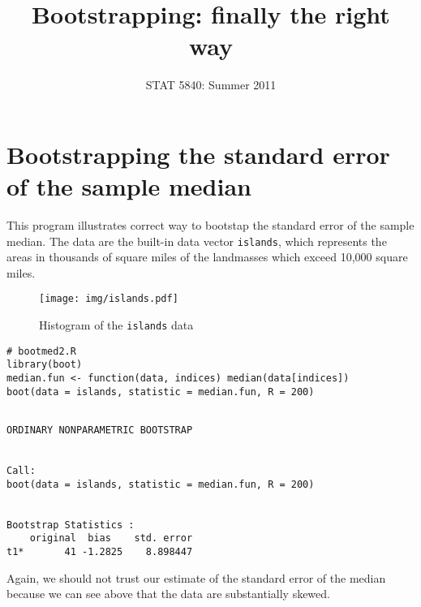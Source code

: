 \documentclass[11pt,english]{article}
\title{Bootstrapping: finally the right way}
\date{STAT 5840: Summer 2011}
\begin{document}
\maketitle

\thispagestyle{empty}

\section*{Bootstrapping the standard error of the sample median}
\label{sec-1}

This program illustrates correct way to bootstap the standard error of the sample median.  The data are the built-in data vector \texttt{islands}, which represents the areas in thousands of square miles of the landmasses which exceed 10,000 square miles.


\begin{figure}[h!]
\centering
\texttt{[image: img/islands.pdf]}
\caption{\label{fig:yplot}Histogram of the \texttt{islands} data}
\end{figure}


\begin{verbatim}
# bootmed2.R
library(boot)
median.fun <- function(data, indices) median(data[indices])
boot(data = islands, statistic = median.fun, R = 200)
\end{verbatim}

\begin{verbatim}
 
ORDINARY NONPARAMETRIC BOOTSTRAP


Call:
boot(data = islands, statistic = median.fun, R = 200)


Bootstrap Statistics :
    original  bias    std. error
t1*       41 -1.2825    8.898447
\end{verbatim}

Again, we should not trust our estimate of the standard error of the median because we can see above that the data are substantially skewed.
\end{document}
